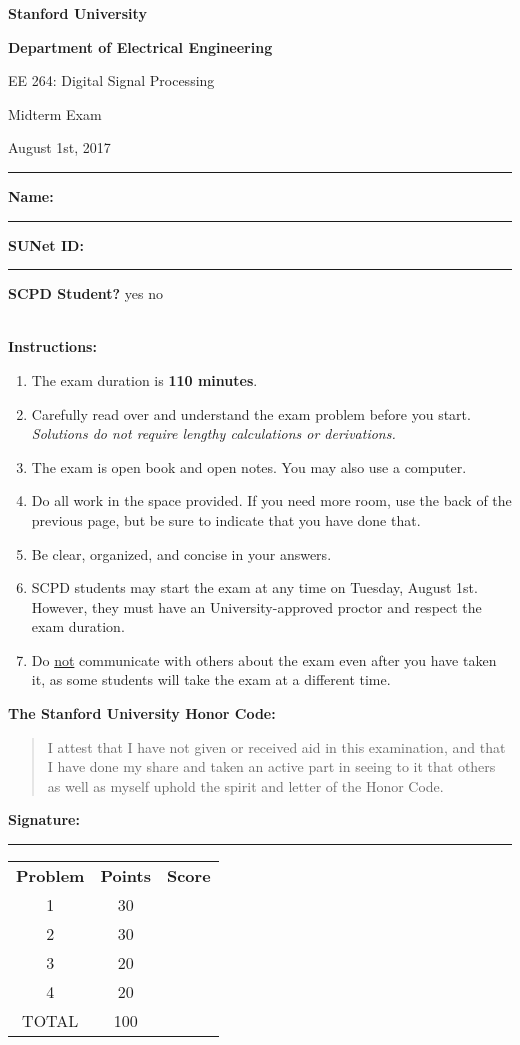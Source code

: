 \doublespacing
\begin{center}
\textbf{\Large Stanford University}

\textbf{\Large Department of Electrical Engineering}

\Large EE 264: Digital Signal Processing 

\Large Midterm Exam

\Large August 1st, 2017
\end{center}
\vspace{-0.5cm}
\rule{\textwidth}{1pt}

\noindent\textbf{Name:} \rule{0.85\textwidth}{0.5pt}

\noindent\textbf{SUNet ID:} \rule{0.3\textwidth}{0.5pt}\qquad 
\textbf{SCPD Student?} yes no

\mbox{}\\
\textbf{Instructions:}
\singlespacing
\begin{enumerate}
\item The exam duration is \textbf{110 minutes}.
\item Carefully read over and understand the exam problem before you start. \textit{Solutions do not require lengthy calculations or derivations.}
\item The exam is open book and open notes. You may also use a computer.
\item Do all work in the space provided. If you need more room, use the back of the previous page, but be sure to indicate that you have done that.
\item Be clear, organized, and concise in your answers.
\item SCPD students may start the exam at any time on Tuesday, August 1st. However, they must have an University-approved proctor and respect the exam duration.
\item Do \underline{not} communicate with others about the exam even after you have taken it, as some students will take the exam at a different time.
\end{enumerate}

\noindent\textbf{The Stanford University Honor Code:}
\begin{quote}
I attest that I have not given or received aid in this examination, and that I have done my share and taken an active part in seeing to it that others as well as myself uphold the spirit and letter of the Honor Code.
\end{quote}
\vspace{1mm}

\begin{center}\textbf{Signature:} \rule{0.7\textwidth}{0.5pt}\end{center}

\doublespacing
\vspace{0.1cm}
\begin{center}
\begin{tabular}{ccc}
\textbf{Problem} & \textbf{Points} & \textbf{Score} \\
1 & 30 & \\
2 & 30 & \\
3 & 20 & \\
4 & 20 & \\
TOTAL & 100 & \\
\end{tabular}
\end{center}
\singlespacing